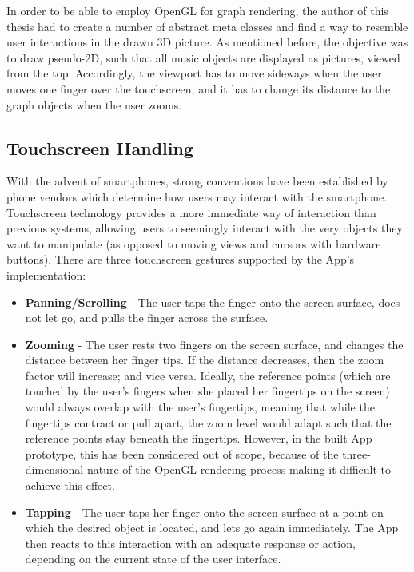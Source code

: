 In order to be able to employ OpenGL for graph rendering, the author of this thesis had to create a number of abstract meta classes and find a way to resemble user interactions in the drawn 3D picture. As mentioned before, the objective was to draw pseudo-2D, such that all music objects are displayed as pictures, viewed from the top. Accordingly, the viewport has to move sideways when the user moves one finger over the touchscreen, and it has to change its distance to the graph objects when the user zooms.

\subsection{Touchscreen Handling}

With the advent of smartphones, strong conventions have been established by phone vendors which determine how users may interact with the smartphone. Touchscreen technology provides a more immediate way of interaction than previous systems, allowing users to seemingly interact with the very objects they want to manipulate (as opposed to moving views and cursors with hardware buttons).
There are three touchscreen gestures supported by the App's implementation:

\begin{itemize}
	\item \textbf{Panning/Scrolling} - The user taps the finger onto the screen surface, does not let 
	go, and pulls the finger across the surface.
	\item \textbf{Zooming} - The user rests two fingers on the screen surface, and changes the distance	between her finger tips. If the distance decreases, then the zoom factor will increase; and vice versa.	Ideally, the reference points (which are touched by the user's fingers when she placed her fingertips on the screen) would always overlap with the user's fingertips, meaning that while the fingertips contract or pull apart, the zoom level would adapt such that the reference points stay beneath the fingertips. However, in the built App prototype, this has been considered out of scope, because of the three-dimensional nature of the OpenGL	rendering process making it difficult to achieve this effect.
	\item \textbf{Tapping} - The user taps her finger onto the screen surface at a point on which the
	desired object is located, and lets go again immediately. The App then reacts to this interaction
	with an adequate response or action, depending on the current state of the user interface.
\end{itemize}

